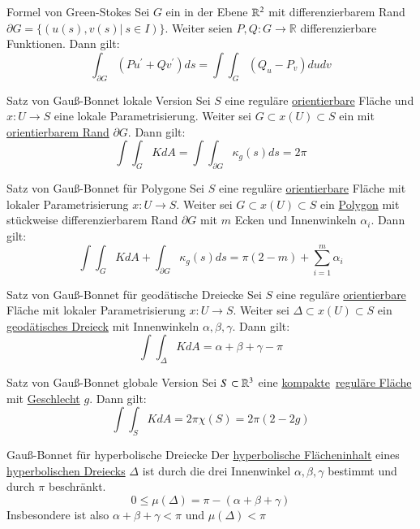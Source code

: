 \begin{titleDef}{Formel von Green-Stokes}
\label{greenStokes}
Sei $G$ ein \aeGebiet in der Ebene $\mathbb{R}^2$ mit differenzierbarem Rand $\partial G=\{(u(s),v(s)|\ s\in I)\}$. Weiter seien $P,Q:G\to \mathbb{R}$ differenzierbare Funktionen. Dann gilt:
$$\int_{\partial G}(Pu^\prime+Qv^\prime)ds=\int\int_{G}(Q_u-P_v)dudv$$
\end{titleDef}

\begin{titleDef}{Satz von Gauß-Bonnet lokale Version}
\label{gaussLokal}
Sei $S$ eine reguläre \hyperref[orientierbar]{orientierbare} Fläche und $x:U\to S$ eine lokale Parametrisierung. Weiter sei $G\subset x(U)\subset S$ ein \aeGebiet mit \hyperref[orientierbar]{orientierbarem Rand} $\partial G$. Dann gilt:
$$\int\int_GKdA=\int\int_{\partial G}\kappa_g(s)ds=2\pi$$
\end{titleDef}

\begin{titleDef}{Satz von Gauß-Bonnet für Polygone}
\label{gaussPolygon}
Sei $S$ eine reguläre \hyperref[orientierbar]{orientierbare} Fläche mit lokaler Parametrisierung $x:U\to S$. Weiter sei $G\subset x(U)\subset S$ ein \hyperref[polygon]{Polygon} mit stückweise differenzierbarem Rand $\partial G$ mit $m$ Ecken und Innenwinkeln $\alpha_i$. Dann gilt:
$$\int\int_GKdA+\int_{\partial G}\kappa_g(s)ds=\pi(2-m)+\sum_{i=1}^{m}\alpha_i$$
\end{titleDef}

\begin{titleDef}{Satz von Gauß-Bonnet für geodätische Dreiecke}
\label{gaussGeoDreieck}
Sei $S$ eine reguläre \hyperref[orientierbar]{orientierbare} Fläche mit lokaler Parametrisierung $x:U\to S$. Weiter sei $\Delta\subset x(U)\subset S$ ein \hyperref[geodaetischeDreiecke]{geodätisches Dreieck} mit Innenwinkeln $\alpha,\beta,\gamma$. Dann gilt:
$$\int\int_{\Delta}KdA=\alpha+\beta+\gamma-\pi$$
\end{titleDef}

\begin{titleDef}{Satz von Gauß-Bonnet globale Version}
\label{gaussGlobal}
Sei $S\subset\mathbb{R}^3$ eine \hyperref[kompakt]{kompakte}~\hyperref[regFlaeche]{reguläre Fläche} mit \hyperref[geschlecht]{Geschlecht} $g$. Dann gilt:
$$\int\int_{S}KdA=2\pi\chi(S)=2\pi(2-2g)$$
\end{titleDef}

\begin{titleDef}{Gauß-Bonnet für hyperbolische Dreiecke}
	Der \hyperref[hyperFlaeche]{hyperbolische Flächeninhalt} eines \hyperref[hyperDreieck]{hyperbolischen Dreiecks} $\Delta$ ist durch die drei Innenwinkel $\alpha,\beta,\gamma$ bestimmt und durch $\pi$ beschränkt.
	$$0\leq\mu(\Delta)=\pi-(\alpha+\beta+\gamma)$$
	Insbesondere ist also $\alpha+\beta+\gamma<\pi$ und $\mu(\Delta)<\pi$
\end{titleDef}